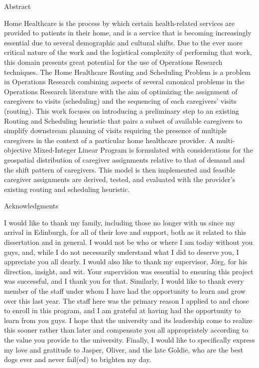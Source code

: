 \documentclass[11pt,twoside]{article}
\numberwithin{Theorem}{section}
\numberwithin{Definition}{section}
\numberwithin{Lemma}{section}
\numberwithin{Algorithm}{section}
\numberwithin{equation}{section}
\begin{document}
\begin{center}
\Large{Abstract}
\end{center}
Home Healthcare is the process by which certain health-related services are provided to patients in their home, and is a service that is becoming increasingly essential due to several demographic and cultural shifts. Due to the ever more critical nature of the work and the logistical complexity of performing that work, this domain presents great potential for the use of Operations Research techniques. The Home Healthcare Routing and Scheduling Problem is a problem in Operations Research combining aspects of several canonical problems in the Operations Research literature with the aim of optimizing the assignment of caregivers to visits (scheduling) and the sequencing of each caregivers' visits (routing). This work focuses on introducing a preliminary step to an existing Routing and Scheduling heuristic that pairs a subset of available caregivers to simplify downstream planning of visits requiring the presence of multiple caregivers in the context of a particular home healthcare provider. A multi-objective Mixed-Integer Linear Program is formulated with considerations for the geospatial distribution of caregiver assignments relative to that of demand and the shift pattern of caregivers. This model is then implemented and feasible caregiver assignments are derived, tested, and evaluated with the provider's existing routing and scheduling heuristic. 

\clearpage

\begin{center}
\Large{Acknowledgments}
\end{center}

I would like to thank my family, including those no longer with us since my arrival in Edinburgh, for all of their love and support, both as it related to this dissertation and in general. I would not be who or where I am today without you guys, and, while I do not necessarily understand what I did to deserve you, I appreciate you all dearly. I would also like to thank my supervisor, Jörg, for his direction, insight, and wit. Your supervision was essential to ensuring this project was successful, and I thank you for that. Similarly, I would like to thank every member of the staff under whom I have had the opportunity to learn and grow over this last year. The staff here was the primary reason I applied to and chose to enroll in this program, and I am grateful at having had the opportunity to learn from you guys. I hope that the university and its leadership come to realize this sooner rather than later and compensate you all appropriately according to the value you provide to the university. Finally, I would like to specifically express my love and gratitude to Jasper, Oliver, and the late Goldie, who are the best dogs ever and never fail(ed) to brighten my day. 
\end{document}

